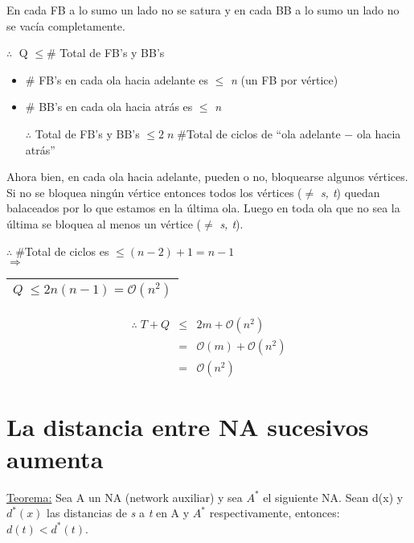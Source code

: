 \documentclass[12pt,a4paper]{report}
\newcounter{neq}
\begin{document}
			En cada FB a lo sumo un lado no se satura y en cada BB a lo sumo un lado no se vacía completamente.
			
			\vspace{2mm}
			$\therefore \;$ Q $\leq \#$ Total de FB's y BB's 
	
			\begin{itemize}
				\item $\#$ FB's en cada ola hacia adelante es $\leq$ \textit{n} (un FB por vértice)
				\item $\#$ BB's en cada ola hacia atrás es $\leq$ \textit{n}

				$\therefore$ Total de FB's y BB's $\leq 2 \; n \; \#$Total de ciclos de \textquotedblleft ola adelante $-$ ola hacia atrás\textquotedblright
 			\end{itemize}
	
			Ahora bien, en cada ola hacia adelante, pueden o no, bloquearse algunos vértices. Si no se bloquea ningún vértice entonces todos los vértices ($\neq$ \textit{s, t}) quedan balaceados por lo que estamos en la última ola. Luego en toda ola que no sea la última se bloquea al menos un vértice ($\neq$ \textit{s, t}).
			
			\begin{center}
			$\therefore \; \#$Total de ciclos es $\leq (n-2)+1 = n-1$ \\
			$\Rightarrow$ \begin{tabular}{|c|} \hline $Q \; \leq 2 n (n-1) = \mathcal{O}(n^{2})$ \\ \hline \end{tabular}
			\end{center}
	
			\begin{eqnarray}
				\nonumber \therefore \; T + Q & \leq & 2 m + \mathcal{O}(n^{2}) \\
				\nonumber & = & \mathcal{O}(m) + \mathcal{O}(n^{2}) \\
				\nonumber & = & \mathcal{O}(n^{2})
			\end{eqnarray}


	\section{La distancia entre NA sucesivos aumenta}
	
		\underline{Teorema:} Sea A un NA (network auxiliar) y sea $A^{*}$ el siguiente NA. Sean d(x) y $d^{*}(x)$ las distancias de \textit{s} a \textit{t} en A y $A^{*}$ respectivamente, entonces: $d(t) < d^{*}(t)$.
		
\end{document}
